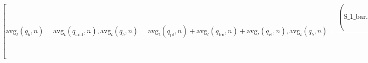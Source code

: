 \documentclass[fleqn]{article}
\begin{document}
\[\displaystyle \tag{\% o199} 
\operatorname{[}{{\ensuremath{\mathrm{avg}}}_t}\left( {q_b}\operatorname{,}n\right) ={{\ensuremath{\mathrm{avg}}}_t}\left( {q_{\ensuremath{\mathrm{add}}}}\operatorname{,}n\right) \operatorname{,}{{\ensuremath{\mathrm{avg}}}_t}\left( {q_b}\operatorname{,}n\right) ={{\ensuremath{\mathrm{avg}}}_t}\left( {q_{\ensuremath{\mathrm{pl}}}}\operatorname{,}n\right) +{{\ensuremath{\mathrm{avg}}}_t}\left( {q_{\ensuremath{\mathrm{fm}}}}\operatorname{,}n\right) +{{\ensuremath{\mathrm{avg}}}_t}\left( {q_{\ensuremath{\mathrm{el}}}}\operatorname{,}n\right) \operatorname{,}{{\ensuremath{\mathrm{avg}}}_t}\left( {q_b}\operatorname{,}n\right) =
\frac{\left( \ensuremath{\mathrm{S\_ 1\_ bar}}\ensuremath{\mathrm{ . }}\begin{pmatrix}{{\eta }_{\ensuremath{\mathrm{11}}}} & {{\eta }_{\ensuremath{\mathrm{12}}}} & {{\eta }_{\ensuremath{\mathrm{13}}}}\\
{{\eta }_{\ensuremath{\mathrm{21}}}} & {{\eta }_{\ensuremath{\mathrm{22}}}} & {{\eta }_{\ensuremath{\mathrm{23}}}}\\
{{\eta }_{\ensuremath{\mathrm{31}}}} & {{\eta }_{\ensuremath{\mathrm{32}}}} & {{\eta }_{\ensuremath{\mathrm{33}}}}\end{pmatrix}\ensuremath{\mathrm{ . }}\ensuremath{\mathrm{S\_ 1\_ bar}}\right)  {{\omega }^{2}}}{2}+\frac{\operatorname{realpart}\left( \left[ {v_1}-{j_1} {{\ensuremath{\mathrm{v0}}}_x}\operatorname{,}{v_1}-{j_1} {{\ensuremath{\mathrm{v0}}}_y}\operatorname{,}{v_1}-{j_1} {{\ensuremath{\mathrm{v0}}}_z}\right] \ensuremath{\mathrm{ . }}{{\ensuremath{\mathrm{J\_ 1}}}_e}\right) }{2 {{\mu }_e}}+\operatorname{[}\frac{{{{{\ensuremath{\mathrm{M1}}}_x}}^{2}} {v_M} {{\mu }_0} {{\omega }^{2}}}{2 {{{{\omega }_M}}^{2}}}+
\frac{\left( {U_1}\ensuremath{\mathrm{ . }}\frac{1}{\tau }\ensuremath{\mathrm{ . }}{U_1}\right)  \ensuremath{\mathrm{p\_ \_ m0}}}{2}\operatorname{,}\frac{{{{{\ensuremath{\mathrm{M1}}}_y}}^{2}} {v_M} {{\mu }_0} {{\omega }^{2}}}{2 {{{{\omega }_M}}^{2}}}+\frac{\left( {U_1}\ensuremath{\mathrm{ . }}\frac{1}{\tau }\ensuremath{\mathrm{ . }}{U_1}\right)  \ensuremath{\mathrm{p\_ \_ m0}}}{2}\operatorname{,}\frac{{{{{\ensuremath{\mathrm{M1}}}_z}}^{2}} {v_M} {{\mu }_0} {{\omega }^{2}}}{2 {{{{\omega }_M}}^{2}}}+\frac{\left( {U_1}\ensuremath{\mathrm{ . }}\frac{1}{\tau }\ensuremath{\mathrm{ . }}{U_1}\right)  \ensuremath{\mathrm{p\_ \_ m0}}}{2}\operatorname{]}\operatorname{]}\mbox{}
\]
\end{document}
